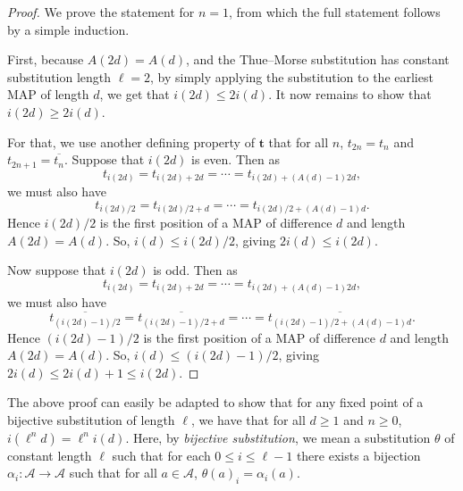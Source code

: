 \documentclass[10pt,a4paper,reqno]{amsart}
\newcommand{\bft}{{\mathbf t}}
\newcommand{\mc}{\mathcal}
\begin{document}
\begin{proof}
We prove the statement for $n=1$, from which the full statement follows by a simple induction.

First, because $A(2d)=A(d)$, and the Thue--Morse substitution has constant substitution length $\ell=2$, by simply applying the substitution to the earliest MAP of length $d$, we get that $i(2d)\leq 2i(d)$. It now remains to show that $i(2d)\geq 2i(d)$.
 
For that, we use another defining property of $\bft$ that for all $n$, $t_{2n} = t_n$ and $t_{2n+1} = \overline{t_n}$. Suppose that $i(2d)$ is even.
    Then as
    \[t_{i(2d)} = t_{i(2d)+2d} = \cdots = t_{i(2d)+(A(d)-1)2d},\]
    we must also have
    \[t_{i(2d)/2} = t_{i(2d)/2+d} = \cdots = t_{i(2d)/2+(A(d)-1)d}.\]
    Hence $i(2d)/2$ is the first position of a MAP of difference $d$ and length $A(2d) = A(d)$.
    So, $i(d) \leq i(2d)/2$, giving $2i(d) \leq i(2d)$.

    Now suppose that $i(2d)$ is odd.
    Then as
    \[t_{i(2d)} = t_{i(2d)+2d} = \cdots = t_{i(2d)+(A(d)-1)2d},\]
    we must also have
    \[\overline{t_{(i(2d)-1)/2}} = \overline{t_{(i(2d)-1)/2+d}} = \cdots = \overline{t_{(i(2d)-1)/2+(A(d)-1)d}}.\]
    Hence $(i(2d)-1)/2$ is the first position of a MAP of difference $d$ and length $A(2d) = A(d)$.
    So, $i(d) \leq (i(2d)-1)/2$, giving $2i(d) \leq 2i(d)+1 \leq i(2d)$.
\end{proof}
\begin{rem}The above proof can easily be adapted to show that for any fixed point of a bijective substitution of length $\ell$, we have that for all $d \geq 1$ and $n \geq 0$, $i(\ell^nd)=\ell^ni(d)$. Here, by \emph{bijective substitution}, we mean a substitution $\theta$ of constant length $\ell$ such that for each $0 \leq i \leq \ell-1$ there exists a bijection $\alpha_i \colon \mc A \to \mc A$ such that for all $a \in \mc A$, $\theta(a)_i = \alpha_i(a)$.\end{rem}
\end{document}
